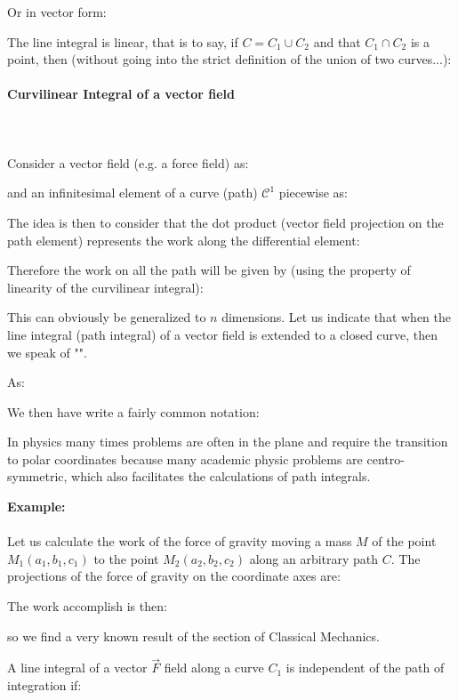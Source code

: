 	Or in vector form:
	
	The line integral is linear, that is to say, if $C=C_1 \cup C_2$ and that $C_1 \cap C_2$ is a point, then (without going into the strict definition of the union of two curves...):
	
	
	\paragraph{Curvilinear Integral of a vector field}\mbox{}\\\\
	Consider a vector field (e.g. a force field) as:
	
	and an infinitesimal element of a curve (path) $\mathcal{C}^1$ piecewise as:
	
	The idea is then to consider that the dot product (vector field projection on the path element) represents the work along the differential element:
	
	Therefore the work on all the path will be given by (using the property of linearity of the curvilinear integral):
	
	This can obviously be generalized to $n$ dimensions. Let us indicate that when the line integral (path integral) of a vector field is extended to a closed curve, then we speak of "".
	
	As:
	
	We then have write a fairly common notation:
	
	\begin{tcolorbox}[title=Remark,colframe=black,arc=10pt]
	In physics many times problems are often in the plane and require the transition to polar coordinates because many academic physic problems are centro-symmetric, which also facilitates the calculations of path integrals.
	\end{tcolorbox}
	
	\begin{tcolorbox}[colframe=black,colback=white,sharp corners]
	\textbf{{\Large {}}Example:}\\\\
	Let us calculate the work of the force of gravity moving a mass $M$ of the point $M_1(a_1,b_1,c_1)$ to the point $M_2(a_2,b_2,c_2)$ along an arbitrary path $C$. The projections of the force of gravity on the coordinate axes are:
	
	The work accomplish is then:
	
	so we find a very known result of the section of Classical Mechanics.
	\end{tcolorbox}
	A line integral of a vector $\vec{F}$ field along a curve $C_1$ is independent of the path of integration if:
	
